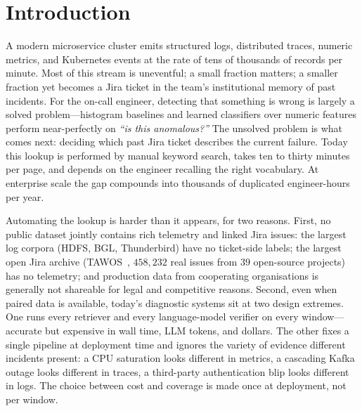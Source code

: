 
\section{Introduction}
\label{sec:intro}

A modern microservice cluster emits structured logs, distributed traces, numeric metrics, and Kubernetes events at the rate of tens of thousands of records per minute. Most of this stream is uneventful; a small fraction matters; a smaller fraction yet becomes a Jira ticket in the team's institutional memory of past incidents. For the on-call engineer, detecting that something is wrong is largely a solved problem---histogram baselines and learned classifiers over numeric features perform near-perfectly on \emph{``is this anomalous?''} The unsolved problem is what comes next: deciding which past Jira ticket describes the current failure. Today this lookup is performed by manual keyword search, takes ten to thirty minutes per page, and depends on the engineer recalling the right vocabulary. At enterprise scale the gap compounds into thousands of duplicated engineer-hours per year.

Automating the lookup is harder than it appears, for two reasons. First, no public dataset jointly contains rich telemetry and linked Jira issues: the largest log corpora (HDFS, BGL, Thunderbird) have no ticket-side labels; the largest open Jira archive (TAWOS~\cite{tawos}, $458{,}232$ real issues from $39$ open-source projects) has no telemetry; and production data from cooperating organisations is generally not shareable for legal and competitive reasons. Second, even when paired data is available, today's diagnostic systems sit at two design extremes. One runs every retriever and every language-model verifier on every window---accurate but expensive in wall time, LLM tokens, and dollars. The other fixes a single pipeline at deployment time and ignores the variety of evidence different incidents present: a CPU saturation looks different in metrics, a cascading Kafka outage looks different in traces, a third-party authentication blip looks different in logs. The choice between cost and coverage is made once at deployment, not per window.


